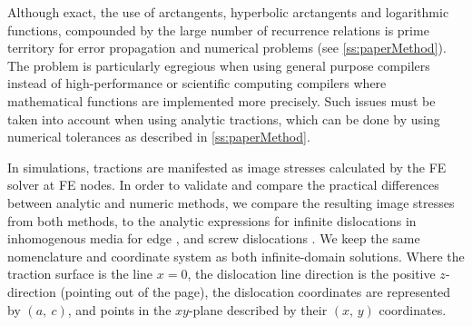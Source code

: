 Although exact, the use of arctangents, hyperbolic arctangents and logarithmic functions, compounded by the large number of recurrence relations is prime territory for error propagation and numerical problems (see \cref{ss:paperMethod}). The problem is particularly egregious when using general purpose compilers instead of high-performance or scientific computing compilers where mathematical functions are implemented more precisely. Such issues must be taken into account when using analytic tractions, which can be done by using numerical tolerances as described in \cref{ss:paperMethod}.

In simulations, tractions are manifested as image stresses calculated by the FE solver at FE nodes. In order to validate and compare the practical differences between analytic and numeric methods, we compare the resulting image stresses from both methods, to the analytic expressions for infinite dislocations in inhomogenous media for edge \cite{head1953edge}, and screw dislocations \cite[p.~59,~64]{hirth1983theory}. We keep the same nomenclature and coordinate system as both infinite-domain solutions. Where the traction surface is the line $x=0$, the dislocation line direction is the positive $z$-direction (pointing out of the page), the dislocation coordinates are represented by $(a,~c)$, and points in the $xy$-plane described by their $(x,\,y)$ coordinates.

